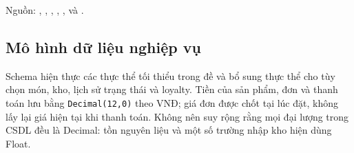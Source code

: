Nguồn: , , , , ,  và .

\subsection{Mô hình dữ liệu nghiệp vụ}

Schema hiện thực các thực thể tối thiểu trong đề và bổ sung thực thể cho tùy chọn món, kho, lịch sử trạng thái và loyalty. Tiền của sản phẩm, đơn và thanh toán lưu bằng \texttt{Decimal(12,0)} theo VNĐ; giá đơn được chốt tại lúc đặt, không lấy lại giá hiện tại khi thanh toán. Không nên suy rộng rằng mọi đại lượng trong CSDL đều là Decimal: tồn nguyên liệu và một số trường nhập kho hiện dùng Float.

